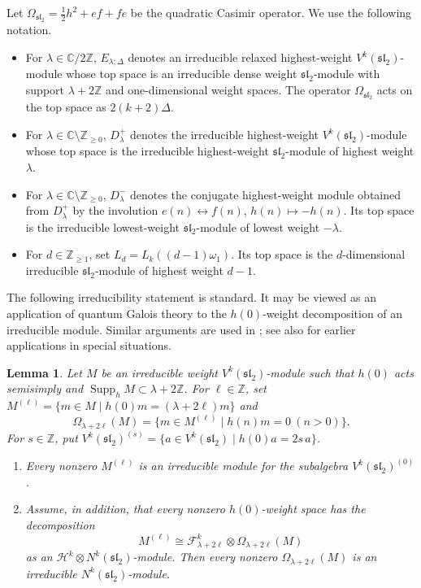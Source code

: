 \documentclass[11 pt]{amsart}
\newtheorem{lemma}{Lemma}
\theoremstyle{definition}
\theoremstyle{plain}
\begin{document}
Let $\Omega_{\mathfrak{sl}_2}=\frac12h^2+ef+fe$ be the quadratic
Casimir operator. We use the following notation.
\begin{itemize}[leftmargin=2.5em]
\item For $\lambda\in\mathbb C/2\mathbb Z$,
$E_{\lambda;\Delta}$ denotes an irreducible relaxed highest-weight
$V^k(\mathfrak{sl}_2)$-module whose top space is an irreducible dense
weight $\mathfrak{sl}_2$-module with support
$\lambda+2\mathbb Z$ and one-dimensional weight spaces. The operator
$\Omega_{\mathfrak{sl}_2}$ acts on the top space as
$2(k+2)\Delta$.

\item For $\lambda\in\mathbb C\setminus\mathbb Z_{\geq0}$,
$D^+_{\lambda}$ denotes the irreducible highest-weight
$V^k(\mathfrak{sl}_2)$-module whose top space is the irreducible
highest-weight $\mathfrak{sl}_2$-module of highest weight $\lambda$.

\item For $\lambda\in\mathbb C\setminus\mathbb Z_{\geq0}$,
$D^-_{\lambda}$ denotes the conjugate highest-weight module obtained
from $D^+_{\lambda}$ by the involution
$e(n)\longleftrightarrow f(n)$, $h(n)\mapsto-h(n)$.
Its top space is the irreducible lowest-weight
$\mathfrak{sl}_2$-module of lowest weight $-\lambda$.

\item For $d\in\mathbb Z_{\ge1}$, set
$L_d=L_k((d-1)\omega_1)$.
Its top space is the $d$-dimensional irreducible $\mathfrak{sl}_2$-module of
highest weight $d-1$.
\end{itemize}

The following irreducibility statement is standard. It may be viewed
as an application of quantum Galois theory to the $h(0)$-weight
decomposition of an irreducible module. Similar arguments are used in
\cite{ACR}; see also \cite{A-2005,A2007} for earlier applications in
special situations.

\begin{lemma}\label{lem:omega-irred}
Let $M$ be an irreducible weight $V^k(\mathfrak{sl}_2)$-module such that
$h(0)$ acts semisimply and
$\operatorname{Supp}_h M\subset\lambda+2\mathbb Z$.
For $\ell\in\mathbb Z$, set
$M^{(\ell)}=\{m\in M\mid h(0)m=(\lambda+2\ell)m\}$
and
\[
\Omega_{\lambda+2\ell}(M)
 =\{m\in M^{(\ell)}\mid h(n)m=0\ (n>0)\}.
\]
For $s\in\mathbb Z$, put
$V^k(\mathfrak{sl}_2)^{(s)}
=\{a\in V^k(\mathfrak{sl}_2)\mid h(0)a=2s\,a\}$.
\begin{enumerate}[label=\textup{(\roman*)}]
\item Every nonzero $M^{(\ell)}$ is an irreducible module for the
subalgebra $V^k(\mathfrak{sl}_2)^{(0)}$.

\item Assume, in addition, that every nonzero $h(0)$-weight space has
the decomposition
\[
  M^{(\ell)}
  \cong\mathcal F^k_{\lambda+2\ell}\otimes
  \Omega_{\lambda+2\ell}(M)
\]
as an $\mathcal H^k\otimes N^k(\mathfrak{sl}_2)$-module. Then every
nonzero $\Omega_{\lambda+2\ell}(M)$ is an irreducible
$N^k(\mathfrak{sl}_2)$-module.
\end{enumerate}
\end{lemma}
\end{document}
